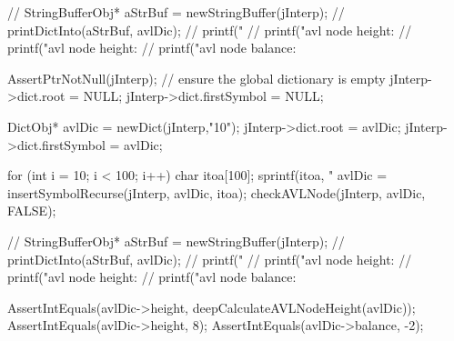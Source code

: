 //  StringBufferObj* aStrBuf = newStringBuffer(jInterp);
//  printDictInto(aStrBuf, avlDic);
//  printf("%
//  printf("avl node height: %
//  printf("avl node height: %
//  printf("avl node balance: %
\stopCTest
\stopTestCase

\startCTest
  AssertPtrNotNull(jInterp);
  // ensure the global dictionary is empty
  jInterp->dict.root        = NULL;
  jInterp->dict.firstSymbol = NULL;

  DictObj* avlDic = newDict(jInterp,"10");
  jInterp->dict.root        = avlDic;
  jInterp->dict.firstSymbol = avlDic;

  for (int i = 10; i < 100; i++) {
    char itoa[100];
    sprintf(itoa, "%
    avlDic = insertSymbolRecurse(jInterp, avlDic, itoa);
  }
  checkAVLNode(jInterp, avlDic, FALSE);

//  StringBufferObj* aStrBuf = newStringBuffer(jInterp);
//  printDictInto(aStrBuf, avlDic);
//  printf("%
//  printf("avl node height: %
//  printf("avl node height: %
//  printf("avl node balance: %

  AssertIntEquals(avlDic->height, deepCalculateAVLNodeHeight(avlDic));
  AssertIntEquals(avlDic->height, 8);
  AssertIntEquals(avlDic->balance, -2);
\stopCTest
\stopTestCase
\stopTestSuite